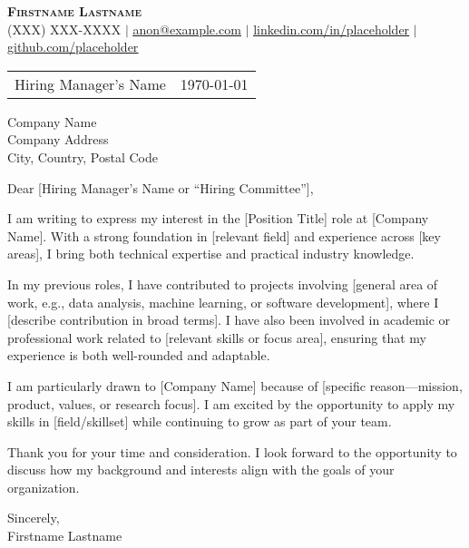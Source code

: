 \documentclass[letterpaper,11pt]{article}
\newcommand{\Name}[1]{\textbf{\Huge \scshape #1}}
\newcommand{\Contact}[1]{\small #1}
\begin{document}
\begin{center}
    \Name{Firstname Lastname} \\ \vspace{1pt}
    \Contact{(XXX) XXX-XXXX $|$ \href{mailto:anon@example.com}{\underline{anon@example.com}} $|$ 
    \href{https://www.linkedin.com/in/placeholder}{\underline{linkedin.com/in/placeholder}} $|$
    \href{https://github.com/placeholder}{\underline{github.com/placeholder}}}
\end{center}

\vspace{3em}

\begin{tabularx}{\textwidth}{X r}
Hiring Manager’s Name & \today \\
\end{tabularx}

Company Name \\
Company Address \\
City, Country, Postal Code \\

\vspace{1.5em}

Dear [Hiring Manager’s Name or “Hiring Committee”],

\vspace{1em}

I am writing to express my interest in the [Position Title] role at [Company Name]. With a strong foundation in [relevant field] and experience across [key areas], I bring both technical expertise and practical industry knowledge.  

In my previous roles, I have contributed to projects involving [general area of work, e.g., data analysis, machine learning, or software development], where I [describe contribution in broad terms]. I have also been involved in academic or professional work related to [relevant skills or focus area], ensuring that my experience is both well-rounded and adaptable.  

I am particularly drawn to [Company Name] because of [specific reason—mission, product, values, or research focus]. I am excited by the opportunity to apply my skills in [field/skillset] while continuing to grow as part of your team.

\vspace{1em}

Thank you for your time and consideration. I look forward to the opportunity to discuss how my background and interests align with the goals of your organization.

\vspace{2em}

Sincerely, \\
\vspace{2em}
Firstname Lastname
\end{document}

